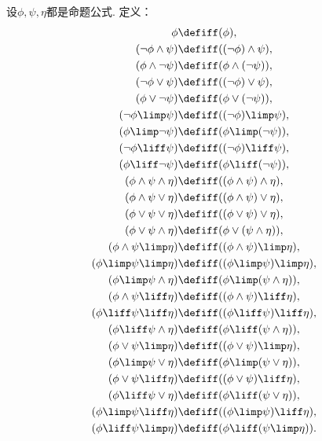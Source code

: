 \begin{definition}\label{definition:命题逻辑.逻辑联结词的优先顺序}
设\(\phi,\psi,\eta\)都是命题公式.
定义：\begin{gather}
	\phi
	\defiff
	(\phi), \\
	(\neg\phi\land\psi)
	\defiff
	((\neg\phi)\land\psi), \\
	(\phi\land\neg\psi)
	\defiff
	(\phi\land(\neg\psi)), \\
	(\neg\phi\lor\psi)
	\defiff
	((\neg\phi)\lor\psi), \\
	(\phi\lor\neg\psi)
	\defiff
	(\phi\lor(\neg\psi)), \\
	(\neg\phi\limp\psi)
	\defiff
	((\neg\phi)\limp\psi), \\
	(\phi\limp\neg\psi)
	\defiff
	(\phi\limp(\neg\psi)), \\
	(\neg\phi\liff\psi)
	\defiff
	((\neg\phi)\liff\psi), \\
	(\phi\liff\neg\psi)
	\defiff
	(\phi\liff(\neg\psi)), \\
	(\phi\land\psi\land\eta)
	\defiff
	((\phi\land\psi)\land\eta), \\
	(\phi\land\psi\lor\eta)
	\defiff
	((\phi\land\psi)\lor\eta), \\
	(\phi\lor\psi\lor\eta)
	\defiff
	((\phi\lor\psi)\lor\eta), \\
	(\phi\lor\psi\land\eta)
	\defiff
	(\phi\lor(\psi\land\eta)), \\
	(\phi\land\psi\limp\eta)
	\defiff
	((\phi\land\psi)\limp\eta), \\
	(\phi\limp\psi\limp\eta)
	\defiff
	((\phi\limp\psi)\limp\eta), \\
	(\phi\limp\psi\land\eta)
	\defiff
	(\phi\limp(\psi\land\eta)), \\
	(\phi\land\psi\liff\eta)
	\defiff
	((\phi\land\psi)\liff\eta), \\
	(\phi\liff\psi\liff\eta)
	\defiff
	((\phi\liff\psi)\liff\eta), \\
	(\phi\liff\psi\land\eta)
	\defiff
	(\phi\liff(\psi\land\eta)), \\
	(\phi\lor\psi\limp\eta)
	\defiff
	((\phi\lor\psi)\limp\eta), \\
	(\phi\limp\psi\lor\eta)
	\defiff
	(\phi\limp(\psi\lor\eta)), \\
	(\phi\lor\psi\liff\eta)
	\defiff
	((\phi\lor\psi)\liff\eta), \\
	(\phi\liff\psi\lor\eta)
	\defiff
	(\phi\liff(\psi\lor\eta)), \\
	(\phi\limp\psi\liff\eta)
	\defiff
	((\phi\limp\psi)\liff\eta), \\
	(\phi\liff\psi\limp\eta)
	\defiff
	(\phi\liff(\psi\limp\eta)).
\end{gather}
\end{definition}

